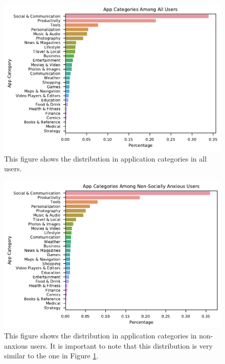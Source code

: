 \documentclass{l4proj}
\begin{document}
\begin{figure}[htb]
    \centering
    \includegraphics[width=\linewidth]{images/sessions/bar_chart_ApplicationSessionCategoryDistribution.pdf}
    \caption{This figure shows the distribution in application categories in all users.}
    \label{fig:session_app_categories} 
\end{figure}

\begin{figure}[htb]
    \centering
    \includegraphics[width=\linewidth]{images/sessions/categories_among_non_anxious.pdf}
    \caption{This figure shows the distribution in application categories in non-anxious users. It is important to note that this distribution is very similar to the one in Figure  \ref{fig:session_app_categories}. }
    \label{fig:categories_among_non_anxious} 
\end{figure}
\end{document}
